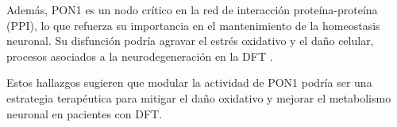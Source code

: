 Además, PON1 es un nodo crítico en la red de interacción proteína-proteína (PPI), lo que refuerza su importancia en el mantenimiento de la homeostasis neuronal. Su disfunción podría agravar el estrés oxidativo y el daño celular, procesos asociados a la neurodegeneración en la DFT \cite{costa2005paraoxonase}.

Estos hallazgos sugieren que modular la actividad de PON1 podría ser una estrategia terapéutica para mitigar el daño oxidativo y mejorar el metabolismo neuronal en pacientes con DFT.